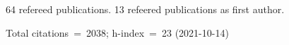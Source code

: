 64 refereed publications. 13 refeered publications as first author.

Total citations~=~2038; h-index~=~23 (2021-10-14)